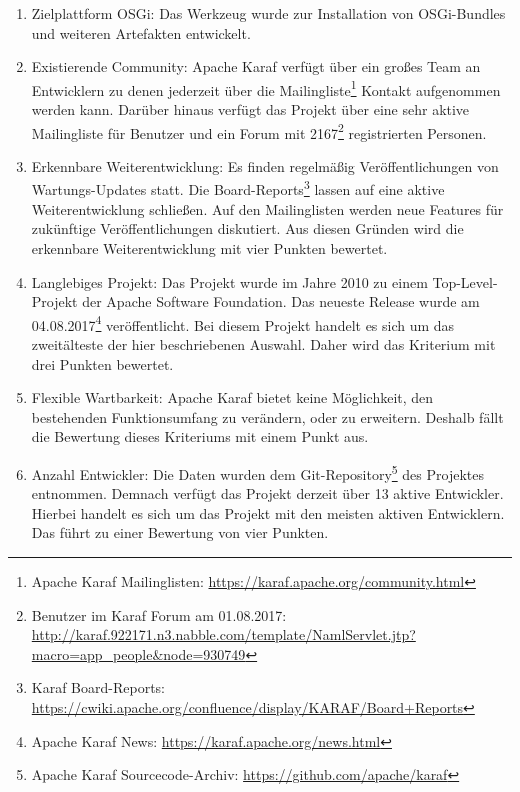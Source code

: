 \begin{enumerate}[label={Nr. \arabic*}, leftmargin=*, labelindent=1em]
 \item Zielplattform \ac{OSGi}: Das Werkzeug wurde zur Installation von \ac{OSGi}-Bundles und weiteren Artefakten entwickelt.
 
 \item Existierende Community:
 Apache Karaf verfügt über ein großes Team an Entwicklern zu denen jederzeit über die Mailingliste\footnote{Apache Karaf Mailinglisten: \url{https://karaf.apache.org/community.html}}
 Kontakt aufgenommen werden kann. 
 Darüber hinaus verfügt das Projekt über eine sehr aktive Mailingliste für Benutzer und ein Forum
 mit 2167\footnote{Benutzer im Karaf Forum am 01.08.2017: \url{http://karaf.922171.n3.nabble.com/template/NamlServlet.jtp?macro=app_people&node=930749}} registrierten Personen.
 
 \item Erkennbare Weiterentwicklung:
 Es finden regelmäßig Veröffentlichungen von Wartungs-Updates statt. 
 Die Board-Reports\footnote{Karaf Board-Reports: \url{https://cwiki.apache.org/confluence/display/KARAF/Board+Reports}} lassen auf eine aktive Weiterentwicklung
 schließen. Auf den Mailinglisten werden neue Features für zukünftige Veröffentlichungen diskutiert.
 Aus diesen Gründen wird die erkennbare Weiterentwicklung mit vier Punkten bewertet.
 
 \item Langlebiges Projekt:
 Das Projekt wurde im Jahre 2010 zu einem Top-Level-Projekt der Apache Software Foundation.
 Das neueste Release wurde am 04.08.2017\footnote{Apache Karaf News: \url{https://karaf.apache.org/news.html}} veröffentlicht. 
 Bei diesem Projekt handelt es sich um das zweitälteste der hier beschriebenen Auswahl. Daher wird das Kriterium mit drei Punkten bewertet.
 
 \item Flexible Wartbarkeit:
 Apache Karaf bietet keine Möglichkeit, den bestehenden Funktionsumfang zu verändern, oder zu erweitern.
 Deshalb fällt die Bewertung dieses Kriteriums mit einem Punkt aus.
 
 \item Anzahl Entwickler: 
  Die Daten wurden dem Git-Repository\footnote{Apache Karaf Sourcecode-Archiv: \url{https://github.com/apache/karaf}} des Projektes entnommen.
  Demnach verfügt das Projekt derzeit über 13 aktive Entwickler.
  Hierbei handelt es sich um das Projekt mit den meisten aktiven Entwicklern. Das führt zu einer Bewertung von vier Punkten.
 
\end{enumerate}

